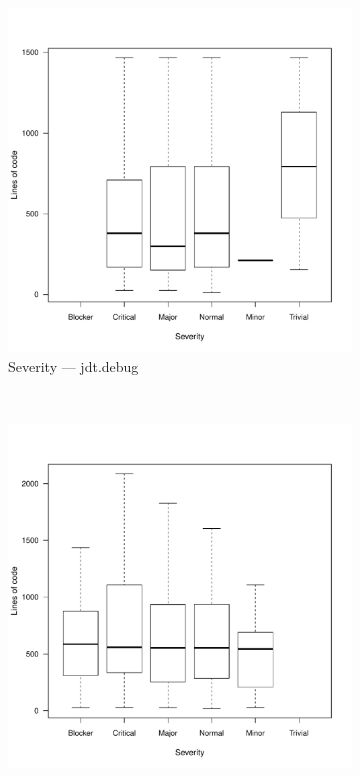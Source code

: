 \begin{figure}
        \begin{subfigure}[b]{0.5\textwidth}
                \centering
                \includegraphics[width=\textwidth]{img/debug-unique-sev-boxplot.pdf}
                \caption{Severity --- jdt.debug}
                \label{fig:box-sev-debug}
        \end{subfigure}
        ~ %
        \begin{subfigure}[b]{0.5\textwidth}
                \centering
                \includegraphics[width=\textwidth]{img/core-unique-sev-boxplot.pdf}

\end{subfigure}
\end{figure}
